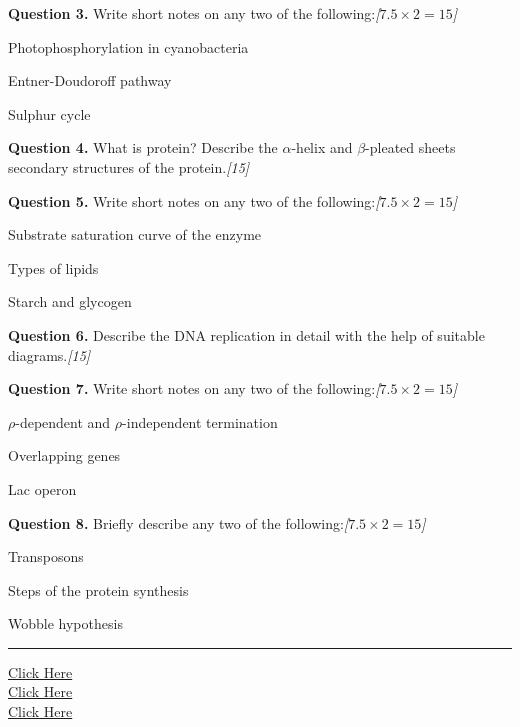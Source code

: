 \documentclass[11pt,a4paper]{article}
\newcommand{\pts}[1]{\hfill   \textit{[#1]}}
\begin{document}
\medskip


\noindent   \textbf{Question 3.} Write short notes on any two of the following:\pts{$7.5  \times 2 = 15$}

\begin{parts}
  \item Photophosphorylation in cyanobacteria
  \item Entner-Doudoroff pathway
  \item Sulphur cycle
\end{parts}

\medskip


\noindent   \textbf{Question 4.} What is protein? Describe the $\alpha$-helix and $\beta$-pleated sheets secondary structures of the protein.\pts{15}

\medskip


\noindent   \textbf{Question 5.} Write short notes on any two of the following:\pts{$7.5  \times 2 = 15$}

\begin{parts}
  \item Substrate saturation curve of the enzyme
  \item Types of lipids
  \item Starch and glycogen
\end{parts}

\medskip


\noindent   \textbf{Question 6.} Describe the DNA replication in detail with the help of suitable diagrams.\pts{15}

\medskip


\noindent   \textbf{Question 7.} Write short notes on any two of the following:\pts{$7.5  \times 2 = 15$}

\begin{parts}
  \item $\rho$-dependent and $\rho$-independent termination
  \item Overlapping genes
  \item Lac operon
\end{parts}

\medskip


\noindent   \textbf{Question 8.} Briefly describe any two of the following:\pts{$7.5  \times 2 = 15$}

\begin{parts}
  \item Transposons
  \item Steps of the protein synthesis
  \item Wobble hypothesis
\end{parts}

\vfill
\rule{\linewidth}{0.4pt}

\begin{center}\small
\href{https://bhu-exam.vercel.app/}{Click Here}\\[4pt]\href{https://me-aryan.vercel.app/}{Click Here}\\[4pt]\href{https://quashan-me.vercel.app/}{Click Here}
\end{center}
\end{document}
